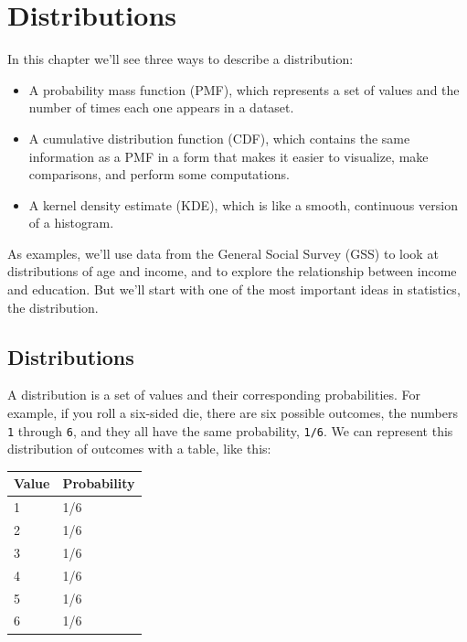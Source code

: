 \hypertarget{distributions}{%
\chapter{Distributions}\label{distributions}}

In this chapter we'll see three ways to describe a distribution:

\begin{itemize}
\item
  A probability mass function (PMF), which represents a set of values
  and the number of times each one appears in a dataset.
\item
  A cumulative distribution function (CDF), which contains the same
  information as a PMF in a form that makes it easier to visualize, make
  comparisons, and perform some computations.
\item
  A kernel density estimate (KDE), which is like a smooth, continuous
  version of a histogram.
\end{itemize}

As examples, we'll use data from the General Social Survey (GSS) to look
at distributions of age and income, and to explore the relationship
between income and education. But we'll start with one of the most
important ideas in statistics, the distribution.

\hypertarget{distributions-1}{%
\section{Distributions}\label{distributions-1}}

A distribution is a set of values and their corresponding probabilities.
For example, if you roll a six-sided die, there are six possible
outcomes, the numbers \passthrough{\lstinline!1!} through
\passthrough{\lstinline!6!}, and they all have the same probability,
\passthrough{\lstinline!1/6!}. We can represent this distribution of
outcomes with a table, like this:

\begin{longtable}[]{@{}ll@{}}
\midrule()
Value & Probability \\
\midrule()
\endhead
1 & 1/6 \\
2 & 1/6 \\
3 & 1/6 \\
4 & 1/6 \\
5 & 1/6 \\
6 & 1/6 \\
\midrule()
\end{longtable}


